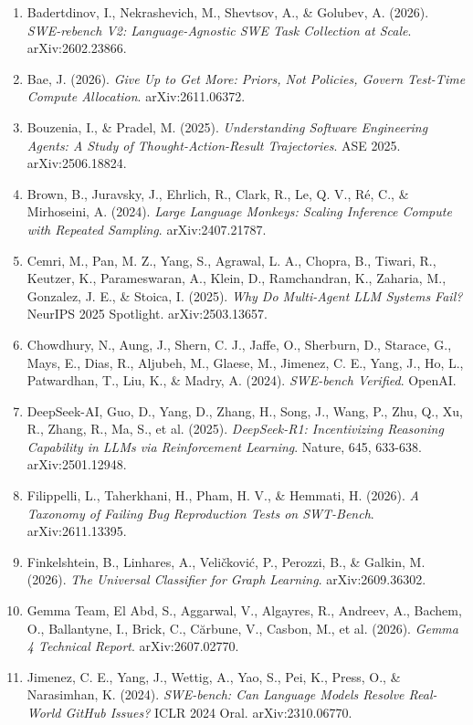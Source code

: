 \documentclass[10pt,a4paper]{article}
\providecommand{\tightlist}{\setlength{\itemsep}{0pt}\setlength{\parskip}{0pt}}
\begin{document}
\begin{enumerate}
\def\labelenumi{\arabic{enumi}.}
\tightlist
\item
  Badertdinov, I., Nekrashevich, M., Shevtsov, A., \& Golubev, A. (2026). \emph{SWE-rebench V2: Language-Agnostic SWE Task Collection at Scale}. arXiv:2602.23866.
\item
  Bae, J. (2026). \emph{Give Up to Get More: Priors, Not Policies, Govern Test-Time Compute Allocation}. arXiv:2611.06372.
\item
  Bouzenia, I., \& Pradel, M. (2025). \emph{Understanding Software Engineering Agents: A Study of Thought-Action-Result Trajectories}. ASE 2025. arXiv:2506.18824.
\item
  Brown, B., Juravsky, J., Ehrlich, R., Clark, R., Le, Q. V., Ré, C., \& Mirhoseini, A. (2024). \emph{Large Language Monkeys: Scaling Inference Compute with Repeated Sampling}. arXiv:2407.21787.
\item
  Cemri, M., Pan, M. Z., Yang, S., Agrawal, L. A., Chopra, B., Tiwari, R., Keutzer, K., Parameswaran, A., Klein, D., Ramchandran, K., Zaharia, M., Gonzalez, J. E., \& Stoica, I. (2025). \emph{Why Do Multi-Agent LLM Systems Fail?} NeurIPS 2025 Spotlight. arXiv:2503.13657.
\item
  Chowdhury, N., Aung, J., Shern, C. J., Jaffe, O., Sherburn, D., Starace, G., Mays, E., Dias, R., Aljubeh, M., Glaese, M., Jimenez, C. E., Yang, J., Ho, L., Patwardhan, T., Liu, K., \& Madry, A. (2024). \emph{SWE-bench Verified}. OpenAI.
\item
  DeepSeek-AI, Guo, D., Yang, D., Zhang, H., Song, J., Wang, P., Zhu, Q., Xu, R., Zhang, R., Ma, S., et al. (2025). \emph{DeepSeek-R1: Incentivizing Reasoning Capability in LLMs via Reinforcement Learning}. Nature, 645, 633-638. arXiv:2501.12948.
\item
  Filippelli, L., Taherkhani, H., Pham, H. V., \& Hemmati, H. (2026). \emph{A Taxonomy of Failing Bug Reproduction Tests on SWT-Bench}. arXiv:2611.13395.
\item
  Finkelshtein, B., Linhares, A., Veličković, P., Perozzi, B., \& Galkin, M. (2026). \emph{The Universal Classifier for Graph Learning}. arXiv:2609.36302.
\item
  Gemma Team, El Abd, S., Aggarwal, V., Algayres, R., Andreev, A., Bachem, O., Ballantyne, I., Brick, C., Cărbune, V., Casbon, M., et al. (2026). \emph{Gemma 4 Technical Report}. arXiv:2607.02770.
\item
  Jimenez, C. E., Yang, J., Wettig, A., Yao, S., Pei, K., Press, O., \& Narasimhan, K. (2024). \emph{SWE-bench: Can Language Models Resolve Real-World GitHub Issues?} ICLR 2024 Oral. arXiv:2310.06770.

\end{enumerate}
\end{document}
